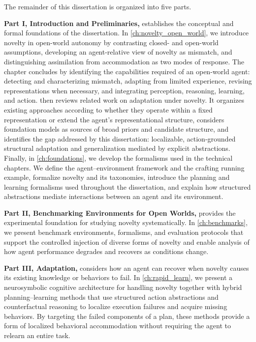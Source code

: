 \label{sec:outline}

The remainder of this dissertation is organized into five parts.

\textbf{Part I, Introduction and Preliminaries,} establishes the conceptual and formal foundations of the dissertation. In \cref{ch:novelty_open_world}, we introduce novelty in open-world autonomy by contrasting closed- and open-world assumptions, developing an agent-relative view of novelty as mismatch, and distinguishing assimilation from accommodation as two modes of response. The chapter concludes by identifying the capabilities required of an open-world agent: detecting and characterizing mismatch, adapting from limited experience, revising representations when necessary, and integrating perception, reasoning, learning, and action.  then reviews related work on adaptation under novelty. It organizes existing approaches according to whether they operate within a fixed representation or extend the agent's representational structure, considers foundation models as sources of broad priors and candidate structure, and identifies the gap addressed by this dissertation: localizable, action-grounded structural adaptation and generalization mediated by explicit abstractions. Finally, in \cref{ch:foundations}, we develop the formalisms used in the technical chapters. We define the agent--environment framework and the crafting running example, formalize novelty and its taxonomies, introduce the planning and learning formalisms used throughout the dissertation, and explain how structured abstractions mediate interactions between an agent and its environment.

\textbf{Part II, Benchmarking Environments for Open Worlds,} provides the experimental foundation for studying novelty systematically. In \cref{ch:benchmarks}, we present benchmark environments, formalisms, and evaluation protocols that support the controlled injection of diverse forms of novelty and enable analysis of how agent performance degrades and recovers as conditions change.

\textbf{Part III, Adaptation,} considers how an agent can recover when novelty causes its existing knowledge or behaviors to fail. In \cref{ch:rapid_learn}, we present a neurosymbolic cognitive architecture for handling novelty together with hybrid planning--learning methods that use structured action abstractions and counterfactual reasoning to localize execution failures and acquire missing behaviors. By targeting the failed components of a plan, these methods provide a form of localized behavioral accommodation without requiring the agent to relearn an entire task.

